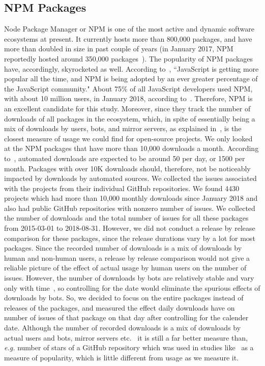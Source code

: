 \documentclass[smallextended]{svjour3}       %
\begin{document}
\subsection{NPM Packages}
Node Package Manager or NPM is one of the most active and dynamic software ecosystems at present. It currently hosts more than 800,000 packages, and have more than doubled in size in past couple of years (in January 2017, NPM reportedly hosted around 350,000 packages~\cite{npmpkg}). The popularity of NPM packages have, accordingly, skyrocketed as well. According to~\cite{npmpop}, ``JavaScript is getting more popular all the time, and NPM is being adopted by an ever greater percentage of the JavaScript community." About 75\% of all JavaScript developers used NPM, with about 10 million users, in January 2018, according to~\cite{npmpop}. Therefore, NPM is an excellent candidate for this study. Moreover, since they track the number of downloads of all packages in the ecosystem, which, in spite of essentially being a mix of downloads by users, bots, and mirror servers, as explained in~\cite{npmdl}, is the closest measure of
usage we could find for open-source projects. We only looked at the
NPM packages that have more than 10,000 downloads a month. According to~\cite{npmdl}, automated downloads are expected to be
around 50 per day, or 1500 per month. Packages with over 10K
downloads should, therefore, not be noticeably impacted by 
 downloads by automated sources. We collected the issues
associated with the projects from their individual GitHub
repositories. We found 4430 projects which had more than 10,000
monthly downloads since January 2018 and also had public GitHub
repositories with nonzero number of issues.  We collected the number
of downloads and the total number of issues for all these packages
from 2015-03-01 to 2018-08-31. However, we did not conduct a release
by release comparison for these packages, since the release
durations vary by a lot for most packages. Since the recorded number
of downloads is a mix of downloads by human and non-human users, a
release by release comparison would not give a reliable picture of
the effect of actual usage by human users on the number of
issues. However, the number of downloads by bots are relatively
stable and vary only with time~\cite{npmdl}, so controlling for the date would
eliminate the spurious effects of downloads by bots. So, we decided
to focus on the entire packages instead of releases of the packages,
and measured the effect daily downloads have on number of issues of
that package on that day after controlling for the calender date.
Although the number of recorded downloads is a mix of downloads by actual users and bots, mirror servers etc.~\cite{npmdl} it is still a far better measure than, \emph{e.g.} number of stars of a GitHub repository which was used in studies like~\cite{borges2016understanding} as a measure of popularity, which is little different from usage as we measure it.
\end{document}
